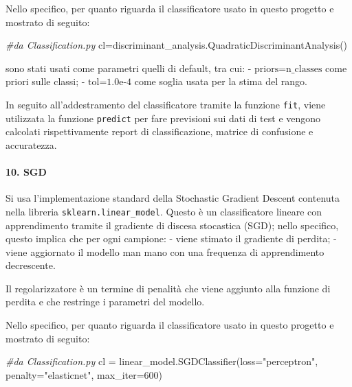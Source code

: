 \documentclass[11pt]{article}
\newenvironment{Shaded}{}{}
\newcommand{\DecValTok}[1]{\textcolor[rgb]{0.25,0.63,0.44}{{#1}}}
\newcommand{\StringTok}[1]{\textcolor[rgb]{0.25,0.44,0.63}{{#1}}}
\newcommand{\CommentTok}[1]{\textcolor[rgb]{0.38,0.63,0.69}{\textit{{#1}}}}
\newcommand{\NormalTok}[1]{{#1}}
\newcommand{\OperatorTok}[1]{\textcolor[rgb]{0.40,0.40,0.40}{{#1}}}
\begin{document}
Nello specifico, per quanto riguarda il classificatore usato in questo
progetto e mostrato di seguito:

\begin{Shaded}
\begin{Highlighting}[]
\CommentTok{#da Classification.py}
\NormalTok{cl}\OperatorTok{=}\NormalTok{discriminant_analysis.QuadraticDiscriminantAnalysis()      }
\end{Highlighting}
\end{Shaded}

sono stati usati come parametri quelli di default, tra cui: -
\(\text{priors=n_classes}\) come priori sulle classi; -
\(\text{tol=1.0e-4}\) come soglia usata per la stima del rango.

In seguito all'addestramento del classificatore tramite la funzione
\texttt{fit}, viene utilizzata la funzione \texttt{predict} per fare
previsioni sui dati di test e vengono calcolati rispettivamente report
di classificazione, matrice di confusione e accuratezza.

    \paragraph{10. SGD}\label{sgd}

    Si usa l'implementazione standard della Stochastic Gradient Descent
contenuta nella libreria \texttt{sklearn.linear\_model}. Questo è un
classificatore lineare con apprendimento tramite il gradiente di discesa
stocastica (SGD); nello specifico, questo implica che per ogni campione:
- viene stimato il gradiente di perdita; - viene aggiornato il modello
man mano con una frequenza di apprendimento decrescente.

Il regolarizzatore è un termine di penalità che viene aggiunto alla
funzione di perdita e che restringe i parametri del modello.

Nello specifico, per quanto riguarda il classificatore usato in questo
progetto e mostrato di seguito:

\begin{Shaded}
\begin{Highlighting}[]
\CommentTok{#da Classification.py}
\NormalTok{cl }\OperatorTok{=}\NormalTok{ linear_model.SGDClassifier(loss}\OperatorTok{=}\StringTok{"perceptron"}\NormalTok{, penalty}\OperatorTok{=}\StringTok{"elasticnet"}\NormalTok{, max_iter}\OperatorTok{=}\DecValTok{600}\NormalTok{)   }
\end{Highlighting}
\end{Shaded}
\end{document}
